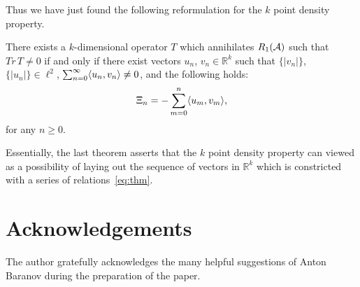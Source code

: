 \documentclass[12pt]{amsart}
\theoremstyle{case}
\begin{document}
  Thus we have just found the following reformulation for the $k$ point density property.
  \begin{prop}
    \label{prop:kreformulation}
    There exists a $k$-dimensional operator $T$ which annihilates $R_1(\cal{A})$
      such that $Tr\, T \neq 0$ if and only if
      there exist vectors $u_n$, $v_n \in \mathbb{R}^k$ such that
      $\{\lvert v_n \rvert\}$, $\{\lvert u_n \rvert\} \in \ell^2$,
      $\sum_{n=0}^\infty \inner{u_n}{v_n} \neq 0$, and the following holds:
      \begin{equation}
        \label{eq:thm}
        \Xi_n = -\sum_{m=0}^n \inner{u_m}{v_m},
      \end{equation}
      for any $n \geq 0$.
  \end{prop}
  Essentially, the last theorem asserts that the $k$ point density property can viewed as a
    possibility of laying out the sequence of vectors in $\mathbb{R}^k$ which is constricted with
    a series of relations~\eqref{eq:thm}.



\section{Acknowledgements}
  The author gratefully acknowledges the many helpful suggestions of Anton Baranov during the preparation of the paper.


\end{document}
